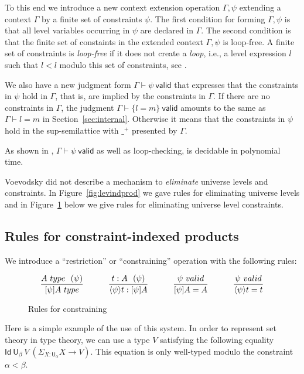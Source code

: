 \documentclass[a4paper,UKenglish,cleveref, autoref, thm-restate]{lipics-v2021}
\newcommand{\Id}{\mathsf{Id}}
\newcommand{\UU}{\mathsf{U}}
\newcommand{\valid}{\mathsf{valid}}
\newcommand{\type}{\mathsf{type}}
\newcommand{\lam}[1]{{\langle}#1{\rangle}}
\newcommand{\set}[1]{\{#1\}}
\begin{document}
To this end we introduce a new context extension operation $\Gamma,\psi$
extending a context $\Gamma$ by a finite set of constraints $\psi$.
The first condition for forming $\Gamma,\psi$ is that all level variables
occurring in $\psi$ are declared in $\Gamma$. The second condition
is that the finite set of constaints in the extended context
$\Gamma,\psi$ is loop-free.
A finite set of constraints is {\em loop-free} if it does not
create a {\em loop}, i.e., a level expression $l$ such that $l<l$
modulo this set of constraints, see \cite{bezem-coquand:lattices}.

We also have a new judgment form $\Gamma\vdash\psi~\valid$ that expresses
that the constraints in $\psi$ hold in $\Gamma$, that is,
are implied by the constraints in $\Gamma$. If there are
no constraints in $\Gamma$, the judgment $\Gamma\vdash\set{l=m}~\valid$
amounts to the same as $\Gamma\vdash l=m$ in Section~\ref{sec:internal}.
Otherwise it means that the constraints in $\psi$ hold in the
sup-semilattice with $\_^+$ presented by $\Gamma$.

As shown in \cite{bezem-coquand:lattices}, $\Gamma\vdash\psi~\valid$
as well as loop-checking, is decidable in polynomial time.


Voevodsky \cite {VV} did not describe a mechanism to {\em eliminate}
universe levels and constraints. In Figure~\ref{fig:levindprod} we
gave rules for eliminating universe levels
and in Figure~\ref{fig:restriction} below we give rules
for eliminating universe level constraints.

\subsection*{Rules for constraint-indexed products}%
We introduce a ``restriction'' or ``constraining'' operation with
the following rules:
\begin{figure}[H]
  \caption{Rules for constraining}%
  \label{fig:restriction}
$$
\frac{A~\type~~(\psi)}{[\psi]A~\type}~~~~~~~~~
\frac{{t}:A~~(\psi)}{\lam{\psi}{t}:[\psi]A}~~~~~~~~~
\frac{\psi~\valid}{[\psi]A = A}~~~~~~~~~
\frac{\psi~\valid}{\lam{\psi}{t} = t}
\belowdisplayshortskip 1pt
$$
\end{figure}


Here is a simple example of the use of this system.
In order to represent set theory in type
theory, we can use a type $V$ satisfying the following equality $\Id~{\UU_{\beta}}~V~(\Sigma_{X:\UU_{\alpha}}X\rightarrow V)$.
This equation is only well-typed modulo the constraint $\alpha<\beta$.
\end{document}
